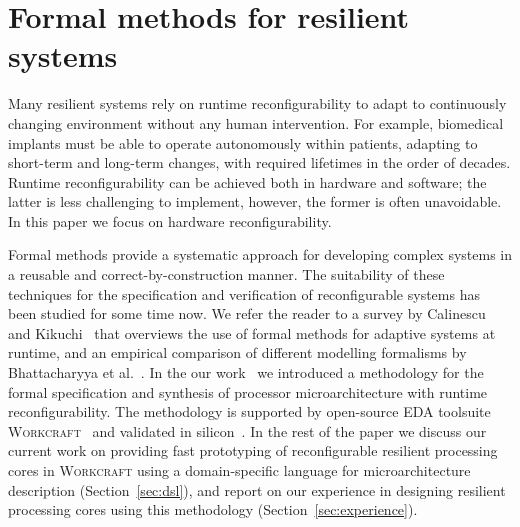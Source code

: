 \documentclass[conference]{IEEEtran}
\begin{document}
\section{Formal methods for resilient systems}
\vspace{-1mm}

Many resilient systems rely on runtime reconfigurability to adapt to
continuously changing environment without any human intervention. For example,
biomedical implants must be able to operate autonomously within patients,
adapting to short-term and long-term changes, with required lifetimes in the
order of decades. Runtime reconfigurability can be achieved both in hardware
and software; the latter is less challenging to implement, however, the former
is often unavoidable. In this paper we focus on hardware reconfigurability.

Formal methods provide a systematic approach for developing complex systems
in a reusable and correct-by-construction manner. The suitability of these
techniques for the specification and verification of reconfigurable
systems has been studied for some time now. We refer the reader to a survey by
Calinescu and Kikuchi~\cite{calinescu2010formal} that overviews the use of
formal methods for adaptive systems at runtime, and an empirical comparison
of different modelling formalisms by
Bhattacharyya et al.~\cite{DBLP:journals/corr/BhattacharyyaMP16}. In the our
work~\cite{ISA-formal} we introduced a methodology for the formal specification
and synthesis of processor microarchitecture with runtime reconfigurability.
The methodology is supported by open-source EDA toolsuite
\textsc{Workcraft}~\cite{workcraft_web} and validated in silicon~\cite{rec-proc}.
In the rest of the paper we discuss our current work on
providing fast prototyping of reconfigurable resilient processing cores in
\textsc{Workcraft} using a domain-specific language for
microarchitecture description (Section~\ref{sec:dsl}), and report on our
experience in designing resilient processing cores using this methodology
(Section~\ref{sec:experience}).

\end{document}
